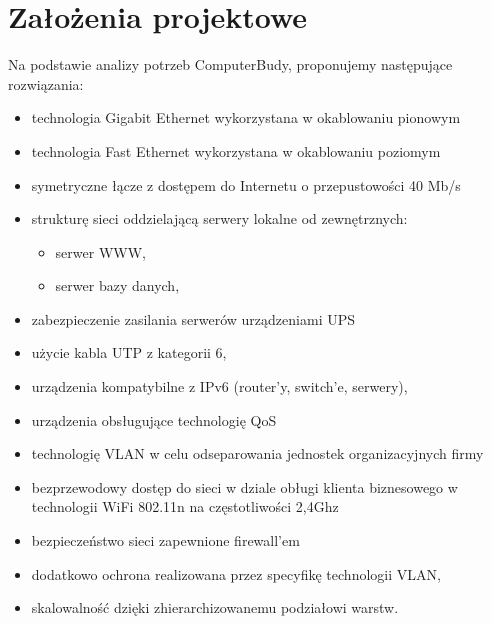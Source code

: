 \documentclass{report}
\begin{document}
\chapter{Założenia projektowe}

Na podstawie analizy potrzeb ComputerBudy, proponujemy
następujące rozwiązania:

\begin{itemize}

\item{technologia Gigabit Ethernet wykorzystana w okablowaniu pionowym}

\item{technologia Fast Ethernet wykorzystana w okablowaniu poziomym}

\item{symetryczne łącze z dostępem do Internetu o przepustowości 40 Mb/s}

\item{strukturę sieci oddzielającą serwery lokalne od zewnętrznych:
 \begin{itemize}
\item serwer WWW,
\item serwer bazy danych,
\end{itemize}}

\item {zabezpieczenie zasilania serwerów urządzeniami UPS}

\item {użycie kabla UTP z kategorii 6,}

\item {urządzenia kompatybilne z IPv6 (router’y, switch’e, serwery),}

\item {urządzenia obsługujące technologię QoS}

\item{technologię VLAN w celu odseparowania jednostek organizacyjnych firmy}

\item{bezprzewodowy dostęp do sieci w dziale obługi klienta biznesowego w technologii WiFi
802.11n na częstotliwości 2,4Ghz}

\item{bezpieczeństwo sieci zapewnione firewall’em}

\item{dodatkowo ochrona realizowana przez specyfikę technologii VLAN,}

\item{skalowalność dzięki zhierarchizowanemu podziałowi warstw.}

\end{itemize}
\end{document}
